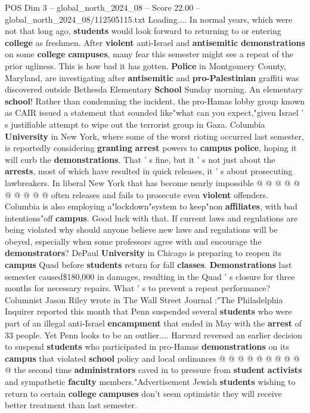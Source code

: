 \begin{textsample}{POS Dim 3 – global\_north\_2024\_08 – Score 22.00 – global\_north\_2024\_08/112505115.txt}  \label{ex:f3_pos_136}
Loading....
In normal years, which were not that long ago, \textbf{students} would look forward to returning to or entering \textbf{college} as freshmen.
After \textbf{violent} anti-Israel and \textbf{antisemitic} \textbf{demonstrations} on some \textbf{college} \textbf{campuses}, many fear this semester might see a repeat of the prior ugliness.
This is how bad it has gotten. \textbf{Police} in Montgomery County, Maryland, are investigating after \textbf{antisemitic} and \textbf{pro-Palestinian} graffiti was discovered outside Bethesda Elementary \textbf{School} Sunday morning.
An elementary \textbf{school}!
Rather than condemning the incident, the pro-Hamas lobby group known as CAIR issued a statement that sounded like"what can you expect,"given Israel ' s justifiable attempt to wipe out the terrorist group in Gaza.
Columbia \textbf{University} in New York, where some of the worst rioting occurred last semester, is reportedly considering \textbf{granting} \textbf{arrest} powers to \textbf{campus} \textbf{police}, hoping it will curb the \textbf{demonstrations}.
That ' s fine, but it ' s not just about the \textbf{arrests}, most of which have resulted in quick releases, it ' s about prosecuting lawbreakers.
In liberal New York that has become nearly impossible @ @ @ @ @ @ @ @ @ @ often releases and fails to prosecute even \textbf{violent} offenders.
Columbia is also employing a"lockdown"system to keep"non \textbf{affiliates}, with bad intentions"off \textbf{campus}.
Good luck with that.
If current laws and regulations are being violated why should anyone believe new laws and regulations will be obeyed, especially when some professors agree with and encourage the \textbf{demonstrators}?
DePaul \textbf{University} in Chicago is preparing to reopen its \textbf{campus} Quad before \textbf{students} return for fall \textbf{classes}. \textbf{Demonstrations} last semester caused\$180,000 in damages, resulting in the Quad ' s closure for three months for necessary repairs.
What ' s to prevent a repeat performance?
Columnist Jason Riley wrote in The Wall Street Journal :"The Philadelphia Inquirer reported this month that Penn suspended several \textbf{students} who were part of an illegal anti-Israel \textbf{encampment} that ended in May with the \textbf{arrest} of 33 people.
Yet Penn looks to be an outlier....
Harvard reversed an earlier decision to suspend \textbf{students} who participated in pro-Hamas \textbf{demonstrations} on its \textbf{campus} that violated \textbf{school} policy and local ordinances @ @ @ @ @ @ @ @ @ @ the second time \textbf{administrators} caved in to pressure from \textbf{student} \textbf{activists} and sympathetic \textbf{faculty} members."Advertisement Jewish \textbf{students} wishing to return to certain \textbf{college} \textbf{campuses} don't seem optimistic they will receive better treatment than last semester.

\end{textsample}
